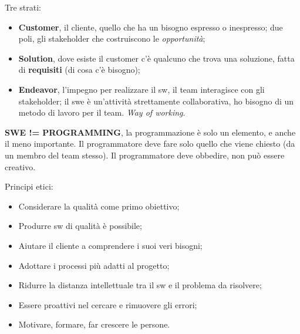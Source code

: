 Tre strati:

\begin{itemize}

	\item \textbf{Customer}, il cliente, quello che ha un bisogno espresso o inespresso; due poli, gli stakeholder che costruiscono le \textit{opportunità};
	\item \textbf{Solution}, dove esiste il customer c'è qualcuno che trova una soluzione, fatta di \textbf{requisiti} (di cosa c'è bisogno);
	\item \textbf{Endeavor}, l'impegno per realizzare il sw, il team interagisce con gli stakeholder; il swe è un'attività strettamente collaborativa, ho bisogno di un metodo di lavoro per il team. \textit{Way of working}.

\end{itemize}

\textbf{SWE != PROGRAMMING}, la programmazione è solo un elemento, e anche il meno importante. Il programmatore deve fare solo quello che viene chiesto (da un membro del team stesso). Il programmatore deve obbedire, non può essere creativo.

Principi etici:

\begin{itemize}

	\item Considerare la qualità come primo obiettivo;
	\item Produrre sw di qualità è possibile;
	\item Aiutare il cliente a comprendere i suoi veri bisogni;
	\item Adottare i processi più adatti al progetto;
	\item Ridurre la distanza intellettuale tra il sw e il problema da risolvere;
	\item Essere proattivi nel cercare e rimuovere gli errori;
	\item Motivare, formare, far crescere le persone.

\end{itemize}

